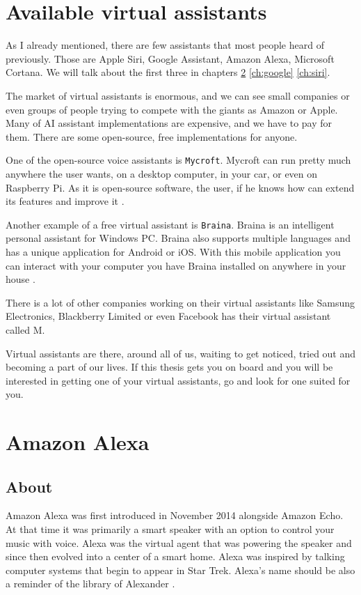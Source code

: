\documentclass[
  digital, %
  oneside, %
  table,   %
  lof,     %
  lot,     %
]{fithesis3}
\begin{document}
\chapter{Available virtual assistants}
As I already mentioned, there are few assistants that most people heard of previously. Those are Apple Siri, Google Assistant, Amazon Alexa, Microsoft Cortana. We will talk about the first three in chapters   \ref{ch:alexa} \ref{ch:google} \ref{ch:siri}.

The market of virtual assistants is enormous, and we can see small companies or even groups of people trying to compete with the giants as Amazon or Apple. Many of AI assistant implementations are expensive, and we have to pay for them. There are some open-source, free implementations for anyone. 

One of the open-source voice assistants is \texttt{Mycroft}. Mycroft can run pretty much anywhere the user wants, on a desktop computer, in your car, or even on Raspberry Pi. As it is open-source software, the user, if he knows how can extend its features and improve it \parencite{mycroft}.

Another example of a free virtual assistant is \texttt{Braina}. Braina is an intelligent personal assistant for Windows PC. Braina also supports multiple languages and has a unique application for Android or iOS. With this mobile application you can interact with your computer you have Braina installed on anywhere in your house \parencite{braina}.

There is a lot of other companies working on their virtual assistants like Samsung Electronics, Blackberry Limited or even Facebook has their virtual assistant called M.

Virtual assistants are there, around all of us, waiting to get noticed, tried out and becoming a part of our lives. If this thesis gets you on board and you will be interested in getting one of your virtual assistants, go and look for one suited for you.

\chapter{Amazon Alexa}\label{ch:alexa}
\section{About}

Amazon Alexa was first introduced in November 2014 alongside Amazon Echo. At that time it was primarily a smart speaker with an option to control your music with voice. Alexa was the virtual agent that was powering the speaker and since then evolved into a center of a smart home. Alexa was inspired by talking computer systems that begin to appear in Star Trek. Alexa's name should be also a reminder of the library of Alexander \parencite{alexa_name}.
\end{document}
